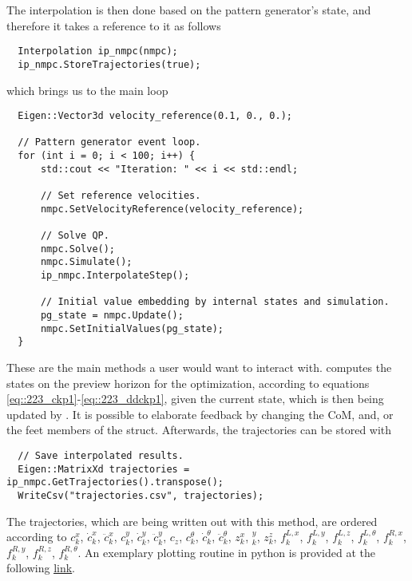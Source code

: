 The interpolation is then done based on the pattern generator's state, and therefore it takes a reference to it as follows
\begin{verbatim}
  Interpolation ip_nmpc(nmpc);
  ip_nmpc.StoreTrajectories(true);
\end{verbatim}
which brings us to the main loop
\begin{verbatim}
  Eigen::Vector3d velocity_reference(0.1, 0., 0.);

  // Pattern generator event loop.
  for (int i = 0; i < 100; i++) {
      std::cout << "Iteration: " << i << std::endl;

      // Set reference velocities.
      nmpc.SetVelocityReference(velocity_reference);

      // Solve QP.
      nmpc.Solve();
      nmpc.Simulate();
      ip_nmpc.InterpolateStep();

      // Initial value embedding by internal states and simulation.
      pg_state = nmpc.Update();
      nmpc.SetInitialValues(pg_state);
  }
\end{verbatim}
These are the main methods a user would want to interact with.  computes the states on the preview horizon for the optimization, according to equations \ref{eq::223_ckp1}-\ref{eq::223_ddckp1}, given the current state, which is then being updated by . It is possible to elaborate feedback by changing the CoM, and, or the feet members of the  struct. Afterwards, the trajectories can be stored with
\begin{verbatim}
  // Save interpolated results.
  Eigen::MatrixXd trajectories = ip_nmpc.GetTrajectories().transpose();
  WriteCsv("trajectories.csv", trajectories);
\end{verbatim}
The trajectories, which are being written out with this method, are ordered according to $c_k^x$, $\dot{c}_k^x$, $\ddot{c}_k^x$, $c_k^y$, $\dot{c}_k^y$, $\ddot{c}_k^y$, $c_z$, $c_k^\theta$, $\dot{c}_k^\theta$, $\ddot{c}_k^\theta$, $z_k^x$, $_k^y$, $z_k^z$, $f_k^{L,x}$, $f_k^{L,y}$, $f_k^{L,z}$, $f_k^{L,\theta}$, $f_k^{R,x}$, $f_k^{R,y}$, $f_k^{R,z}$, $f_k^{R,\theta}$. An exemplary plotting routine in python is provided at the following \href{https://github.com/mhubii/nmpc_pattern_generator/blob/719fde0bb73925923de85cbf379c5523e075dfeb/plot/plot_pattern.py#L15}{\underline{link}}.
\\
